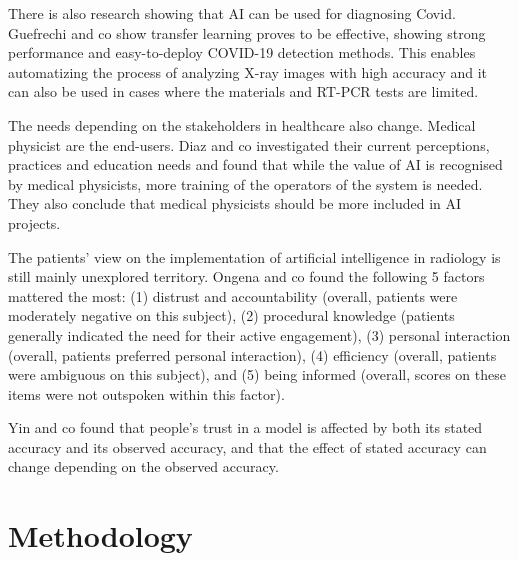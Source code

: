 \documentclass[manuscript,screen,review]{acmart}
\begin{document}
There is also research showing that AI can be used for diagnosing Covid.
Guefrechi and co show transfer learning proves to be effective, showing strong performance and easy-to-deploy COVID-19 detection methods.
This enables automatizing the process of analyzing X-ray images with high accuracy and it can also be used in cases where the materials and RT-PCR tests are limited\cite{Guefrechi2021}.

The needs depending on the stakeholders in healthcare also change.
Medical physicist are the end-users.
Diaz and co investigated their current perceptions, practices and education needs and found that while the value of AI is recognised by medical physicists, more training of the operators of the system is needed.
They also conclude that medical physicists should be more included in AI projects\cite{Diaz2021}.

The patients' view on the implementation of artificial intelligence in radiology is still mainly unexplored territory.
Ongena and co found the following 5 factors mattered the most: (1) distrust and accountability (overall, patients were moderately negative on this subject), (2) procedural knowledge (patients generally indicated the need for their active engagement), (3) personal interaction (overall, patients preferred personal interaction), (4) efficiency (overall, patients were ambiguous on this subject), and (5) being informed (overall, scores on these items were not outspoken within this factor)\cite{Ongena2020}.

Yin and co found that people's trust in a model is affected by both its stated accuracy and its observed accuracy, and that the effect of stated accuracy can change depending on the observed accuracy\cite{Yin2019}.


\newpage
\section{Methodology}\label{sec:methodology}

\end{document}
